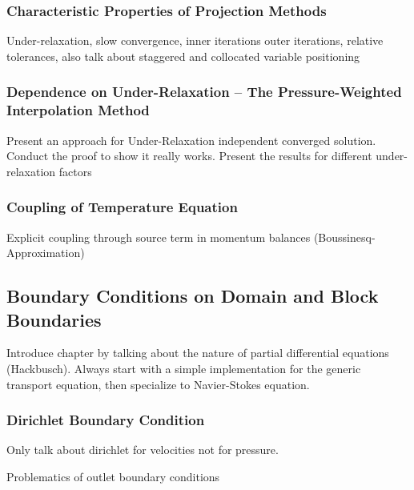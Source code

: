       \subsubsection{Characteristic Properties of Projection Methods}

        Under-relaxation, slow convergence, inner iterations outer iterations, relative tolerances, also talk about staggered and collocated variable positioning

      \subsubsection{Dependence on Under-Relaxation -- The Pressure-Weighted Interpolation Method}

        Present an approach for Under-Relaxation independent converged solution. Conduct the proof to show it really works. Present the results for different under-relaxation factors

      \subsubsection{Coupling of Temperature Equation}

        Explicit coupling through source term in momentum balances (Boussinesq-Approximation)

    \subsection{Boundary Conditions on Domain and Block Boundaries}

        Introduce chapter by talking about the nature of partial differential equations (Hackbusch). Always start with a simple implementation for the generic transport equation, then specialize to Navier-Stokes equation.

      \subsubsection{Dirichlet Boundary Condition}

        Only talk about dirichlet for velocities not for pressure.


        Problematics of outlet boundary conditions

